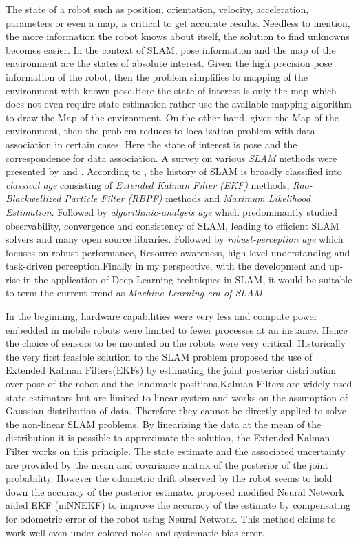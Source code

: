     The state of a robot such as position, orientation, velocity, acceleration, parameters or even a map, is critical to get accurate results. 
    Needless to mention, the more information the robot knows about itself, the solution to find unknowns becomes easier. 
    In the context of SLAM, pose information and the map of the environment are the states of absolute interest. 
    Given the high precision pose information of the robot, then the problem simplifies to mapping of the environment with known pose.Here the state of interest is 
    only the map which does not even require state estimation rather use the available mapping algorithm to draw the Map of the environment. 
    On the other hand, given the Map of the environment, then the problem reduces to localization problem with data association in certain cases. 
    Here the state of interest is pose and the correspondence for data association. A survey on various \textit{SLAM} methods were presented by 
    \cite{C.Cadena} and \cite{T.Takleh}. According to \cite{C.Cadena}, the history of SLAM is broadly classified into \textit{classical age} 
    consisting of \textit{Extended Kalman Filter (EKF)} methods, \textit{Rao-Blackwellized Particle Filter (RBPF)} methods and \textit{Maximum Likelihood Estimation}. 
    Followed by \textit{algorithmic-analysis age} which predominantly studied observability, convergence and consistency of SLAM, 
    leading to efficient SLAM solvers and many open source libraries. Followed by \textit{robust-perception age} which focuses on robust performance, 
    Resource awareness, high level understanding and task-driven perception.Finally in my perspective, with the development and up-rise in the application of 
    Deep Learning techniques in SLAM, it would be suitable to term the current trend as \textit{Machine Learning era of SLAM}

    In the beginning, hardware capabilities were very less and compute power embedded in mobile robots were limited to fewer processes at an instance. Hence the choice of sensors to be mounted on 
    the robots were very critical. Historically the very first feasible solution to the SLAM problem proposed the use of Extended Kalman Filters(EKFs) by estimating the joint posterior distribution 
    over pose of the robot and the landmark positions.Kalman Filters are widely used state estimators but are limited to linear system and works on the assumption of Gaussian distribution of data.
    Therefore they cannot be directly applied to solve the non-linear SLAM problems. By linearizing the data at the mean of the distribution it is possible to approximate the solution, the Extended
    Kalman Filter works on this principle. The state estimate and the associated uncertainty are provided by the mean and covariance matrix of the posterior of the joint probability. 
    However the odometric drift observed by the robot seems to hold down the accuracy of the posterior estimate.\cite{J.Kang} proposed  modified 
    Neural Network aided EKF (mNNEKF) to improve the accuracy of the estimate by compensating for odometric error of the robot using Neural Network. This method claims to work well even under
    colored noise and systematic bias error.


